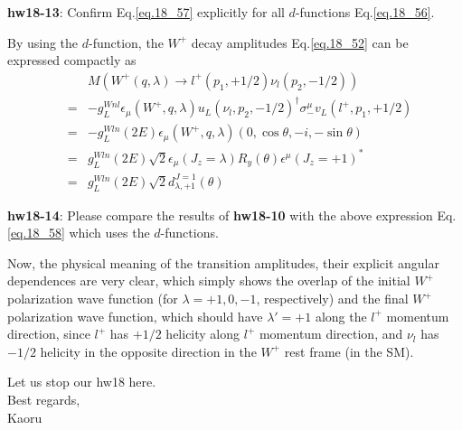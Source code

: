 \documentclass[12pt]{article}
\def\eps{\epsilon}
\def\lmd{\lambda}
\begin{document}
{\bf hw18-13}: Confirm Eq.\ref{eq.18_57} explicitly for all $d$-functions Eq.\ref{eq.18_56}.

By using the $d$-function, the $W^+$ decay amplitudes Eq.\ref{eq.18_52} can be expressed compactly as
\begin{eqnarray}
    &&M(W^+(q,\lmd) \to l^+(p_1,+1/2) \nu_l(p_2,-1/2)) \\
    &=& -g_L^{Wnl} \eps_\mu(W^+,q,\lmd) u_L(\nu_l,p_2,-1/2)^\dagger \sigma_-^\mu v_L(l^+,p_1,+1/2) \\
    &=& -g_L^{Wln} (2E) \eps_\mu(W^+,q,\lmd) ( 0, \cos\theta, -i, -\sin\theta ) \\
    &=& g_L^{Wln} (2E) \sqrt{2} \eps_\mu(J_z=\lmd) R_y(\theta) \eps^\mu(J_z=+1)^* \\
    &=&g_L^{Wln} (2E) \sqrt{2} d^{J=1}_{\lmd,+1}(\theta) \label{eq.18_58}
\end{eqnarray}

{\bf hw18-14}: Please compare the results of {\bf hw18-10} with the above expression Eq.\ref{eq.18_58} which uses the $d$-functions.

Now, the physical meaning of the transition amplitudes, their explicit
angular dependences are very clear, which simply shows the overlap of
the initial $W^+$ polarization wave function (for $\lmd = +1, 0, -1$,
respectively) and the final $W^+$ polarization wave function, which
should have $\lmd' = +1$ along the $l^+$ momentum direction, since $l^+$ has
$+1/2$ helicity along $l^+$ momentum direction, and $\nu_l$ has $-1/2$ helicity
in the opposite direction in the $W^+$ rest frame (in the SM).

Let us stop our hw18 here.\\

Best regards,\\

Kaoru
\end{document}
